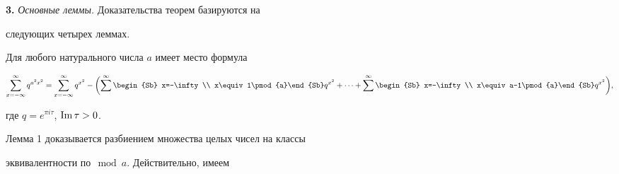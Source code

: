 {\bf 3.} {\it Основные леммы.} Доказательства теорем базируются на


следующих четырех леммах.





\begin{lem}


Для любого натурального числа $a$ имеет место формула


\begin{equation}


\sum^\infty_{x=-\infty}q^{a^2x^2}=


\sum^\infty_{x=-\infty}q^{x^2}-


\biggl(


\sum^\infty


\begin{Sb} x=-\infty \\ x\equiv 1\pmod{a}\end{Sb}


q^{x^2}+\dotsb +


\sum^\infty


\begin{Sb} x=-\infty \\ x\equiv a-1\pmod{a}\end{Sb}q^{x^2}


\biggr),


\end{equation}


где $q=e^{\pi i\tau}$, $\operatorname{Im}\tau>0$.


\end{lem}





Лемма 1 доказывается разбиением множества целых чисел на классы


эквивалентности по$\mod{a}$. Действительно, имеем


